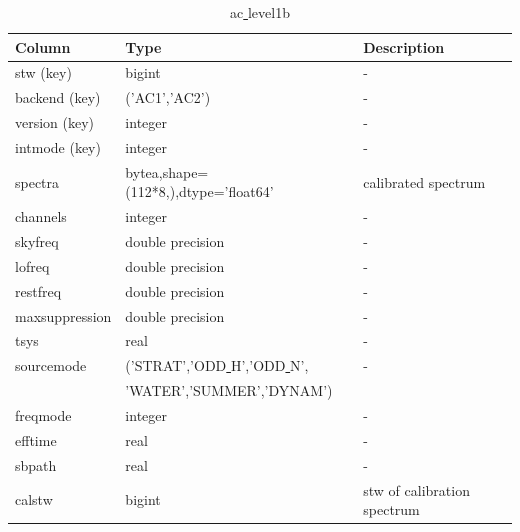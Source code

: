 \documentclass[12pt]{article}
\begin{document}
\begin{table}[ht]
\caption{ac\underline{ }level1b}
\centering
\begin{tabular}{l l l}
\hline\hline
Column & Type & Description \\ [0.5ex]
\hline
 stw (key)               & bigint           & - \\
 backend (key)           & ('AC1','AC2')    & -\\
 version (key)            & integer          & -\\         
 intmode (key)           & integer          & -\\        
 spectra            & bytea,shape=(112*8,),dtype='float64' & calibrated spectrum\\       
 channels           & integer          & -\\          
 skyfreq            & double precision & -\\ 
 lofreq             & double precision & -\\ 
 restfreq           & double precision & -\\ 
 maxsuppression     & double precision & -\\ 
 tsys               & real             & -\\ 
 sourcemode         & ('STRAT','ODD\underline{ }H','ODD\underline{ }N', & -\\
 & 'WATER','SUMMER','DYNAM') & \\ 
 freqmode           & integer          & -\\ 
 efftime            & real             & -\\ 
 sbpath             & real             & -\\ 
 calstw             & bigint           & stw of calibration spectrum\\[1ex]
\hline
\end{tabular}
\label{table:ac1a}
\end{table}
\end{document}
